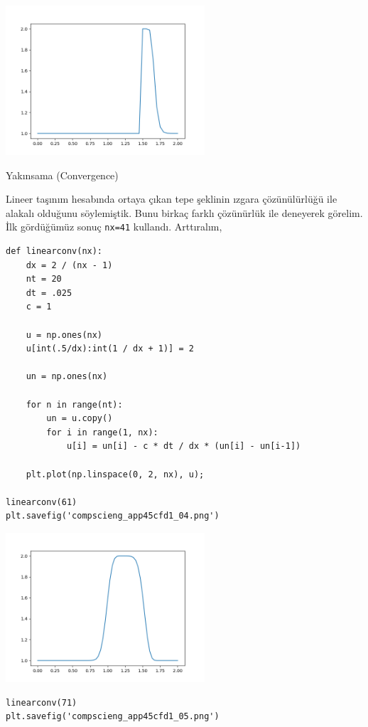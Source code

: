 \documentclass[12pt,fleqn]{article}\usepackage{../../common}
\begin{document}
\includegraphics[width=20em]{compscieng_app45cfd1_03.png}

Yakınsama (Convergence)

Lineer taşınım hesabında ortaya çıkan tepe şeklinin ızgara çözünülürlüğü ile
alakalı olduğunu söylemiştik. Bunu birkaç farklı çözünürlük ile deneyerek
görelim. İlk gördüğümüz sonuç \verb!nx=41! kullandı. Arttıralım,

\begin{verbatim}
def linearconv(nx):
    dx = 2 / (nx - 1)
    nt = 20    
    dt = .025  
    c = 1

    u = np.ones(nx)
    u[int(.5/dx):int(1 / dx + 1)] = 2  

    un = np.ones(nx)

    for n in range(nt):
        un = u.copy() 
        for i in range(1, nx):
            u[i] = un[i] - c * dt / dx * (un[i] - un[i-1])
        
    plt.plot(np.linspace(0, 2, nx), u);

linearconv(61)
plt.savefig('compscieng_app45cfd1_04.png')
\end{verbatim}

\includegraphics[width=20em]{compscieng_app45cfd1_04.png}

\begin{verbatim}
linearconv(71)
plt.savefig('compscieng_app45cfd1_05.png')
\end{verbatim}
\end{document}
